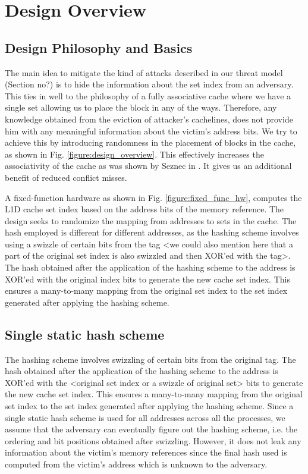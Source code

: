 \section{Design Overview}
\subsection{Design Philosophy and Basics}
The main idea to mitigate the kind of attacks described in our threat model (Section no?) is to hide the information about the set index from an adversary. This ties in well to the philosophy of a fully associative cache where we have a single set allowing us to place the block in any of the ways. Therefore, any knowledge obtained from the eviction of attacker's cachelines, does not provide him with any meaningful information about the victim's address bits. We try to achieve this by introducing randomness in the placement of blocks in the cache, as shown in Fig. \ref{figure:design_overview}. This effectively increases the associativity of the cache as was shown by Seznec in \cite{seznec1993case}. It gives us an additional benefit of reduced conflict misses.

A fixed-function hardware as shown in Fig. \ref{figure:fixed_func_hw}, computes the L1D cache set index based on the address bits of the memory reference. The design seeks to randomize the mapping from addresses to sets in the cache.  The hash employed is different for different addresses, as the hashing scheme involves using a swizzle of certain bits from the tag <we could also mention here that a part of the original set index is also swizzled and then XOR'ed with the tag>. The hash obtained after the application of the hashing scheme to the address is XOR'ed with the original index bits to generate the new cache set index. This ensures a many-to-many mapping from the original set index to the set index generated after applying the hashing scheme. 

\subsection{Single static hash scheme}
The hashing scheme involves swizzling of certain bits from the original tag. The hash obtained after the application of the hashing scheme to the address is XOR'ed with the <original set index or a swizzle of original set> bits to generate the new cache set index. This ensures a many-to-many mapping from the original set index to the set index generated after applying the hashing scheme. Since a single static hash scheme is used for all addresses across all the processes, we assume that the adversary can eventually figure out the hashing scheme, i.e. the ordering and bit positions obtained after swizzling. However, it does not leak any information about the victim's memory references since the final hash used is computed from the victim's address which is unknown to the adversary.

